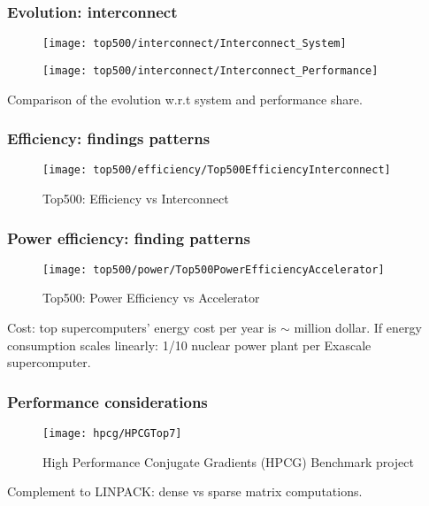 \begin{frame}
  \frametitle{Evolution: interconnect}

\begin{minipage}[bc]{0.4\linewidth}
\centering
\begin{figure}
\centering
\texttt{[image: top500/interconnect/Interconnect\_System]}
\end{figure}
\end{minipage}
\begin{minipage}[bc]{0.4\linewidth}
\centering
\begin{figure}
\centering
\texttt{[image: top500/interconnect/Interconnect\_Performance]}
\end{figure}
\end{minipage}

\smallskip
Comparison of the evolution w.r.t system and performance share.
\end{frame}

\begin{frame}
  \frametitle{Efficiency: findings patterns}

\begin{figure}
\centering
\texttt{[image: top500/efficiency/Top500EfficiencyInterconnect]}
\caption{Top500: Efficiency vs Interconnect}
\end{figure}

\end{frame}

\begin{frame}
  \frametitle{Power efficiency: finding patterns}

\begin{figure}
\centering
\texttt{[image: top500/power/Top500PowerEfficiencyAccelerator]}
\caption{Top500: Power Efficiency vs Accelerator}
\end{figure}

Cost: top supercomputers' energy cost per year is $\sim$ million dollar.
If energy consumption scales linearly: 1/10 nuclear power plant per Exascale supercomputer.

\end{frame}

\begin{frame}
  \frametitle{Performance considerations}

\begin{figure}
\centering
\texttt{[image: hpcg/HPCGTop7]}
\caption{High Performance Conjugate Gradients (HPCG) Benchmark project}
\end{figure}

Complement to LINPACK: dense vs sparse matrix computations.

\end{frame}

